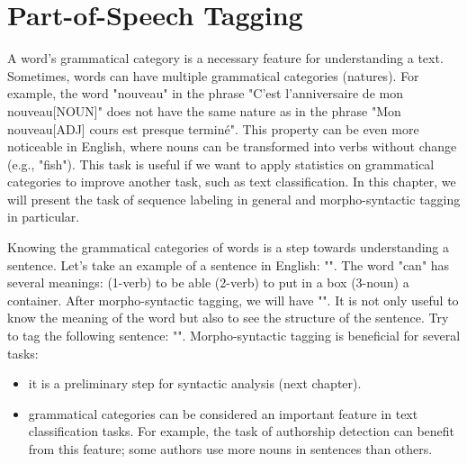 \documentclass{KBook}
\begin{document}
		\mainmatter
	
\fi

\chapter{Part-of-Speech Tagging}

\begin{introduction}
	\lettrine{A}{} word's grammatical category is a necessary feature for understanding a text. Sometimes, words can have multiple grammatical categories (natures). For example, the word "nouveau" in the phrase "C'est l'anniversaire de mon nouveau[NOUN]" does not have the same nature as in the phrase "Mon nouveau[ADJ] cours est presque terminé". This property can be even more noticeable in English, where nouns can be transformed into verbs without change (e.g., "fish"). This task is useful if we want to apply statistics on grammatical categories to improve another task, such as text classification. In this chapter, we will present the task of sequence labeling in general and morpho-syntactic tagging in particular.
\end{introduction} 

Knowing the grammatical categories of words is a step towards understanding a sentence. Let's take an example of a sentence in English: "". The word "can" has several meanings: (1-verb) to be able (2-verb) to put in a box (3-noun) a container. After morpho-syntactic tagging, we will have "". It is not only useful to know the meaning of the word but also to see the structure of the sentence. Try to tag the following sentence: "". Morpho-syntactic tagging is beneficial for several tasks:
\begin{itemize}
	\item it is a preliminary step for syntactic analysis (next chapter).
	\item grammatical categories can be considered an important feature in text classification tasks. For example, the task of authorship detection can benefit from this feature; some authors use more nouns in sentences than others.
\end{itemize}


\end{document}
